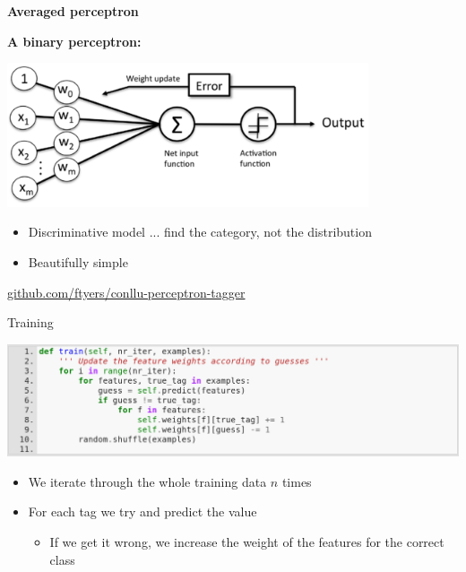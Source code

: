 \documentclass{beamer}
\begin{document}
\begin{frame}
\centering
{\LARGE {\bf Averaged perceptron} }
\end{frame}

\begin{frame}

\textbf{A binary perceptron:}
\begin{center}
\includegraphics[width=0.8\textwidth]{images/perceptron.png}
\end{center}

\begin{itemize}
  \item Discriminative model ... find the category, not the distribution
  \item Beautifully simple
\end{itemize}

\begin{center}
 \url{github.com/ftyers/conllu-perceptron-tagger}
\end{center}

\end{frame}

\begin{frame}{Training}

\begin{center}
\includegraphics[width=\textwidth]{images/perceptron-train.png}
\end{center}

\begin{itemize}
  \item We iterate through the whole training data $n$ times
  \item For each tag we try and predict the value
  \begin{itemize}
    \item If we get it wrong, we increase the weight of the features for the correct class
  \end{itemize}
\end{itemize}


\end{frame}
\end{document}

